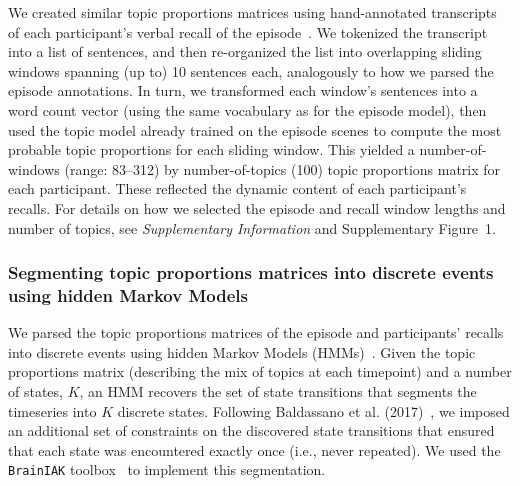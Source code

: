 \documentclass[10pt]{article}
\newcommand{\topicopt}{1}
\begin{document}
We created similar topic proportions matrices using hand-annotated transcripts of each participant's verbal recall of the episode~\citep{ChenEtal17}.  We tokenized the transcript into a list of sentences, and then re-organized the list into overlapping sliding windows spanning (up to) 10 sentences each, analogously to how we parsed the episode annotations.  In turn, we transformed each window's sentences into a word count vector (using the same vocabulary as for the episode model), then used the topic model already trained on the episode scenes to compute the most probable topic proportions for each sliding window.  This yielded a number-of-windows (range: 83--312) by number-of-topics (100) topic proportions matrix for each participant.  These reflected the dynamic content of each participant's recalls.  For details on how we selected the episode and recall window lengths and number of topics, see \textit{Supplementary Information} and Supplementary Figure~\topicopt.


\subsubsection*{Segmenting topic proportions matrices into discrete events using hidden Markov Models}
We parsed the topic proportions matrices of the episode and participants' recalls into discrete events using hidden Markov Models (HMMs)~\citep{Rabi89}.  Given the topic proportions matrix (describing the mix of topics at each timepoint) and a number of states, $K$, an HMM recovers the set of state transitions that segments the timeseries into $K$ discrete states.  Following Baldassano et al. (2017)~\cite{BaldEtal17}, we imposed an additional set of constraints on the discovered state transitions that ensured that each state was encountered exactly once (i.e., never repeated).  We used the \texttt{BrainIAK} toolbox~\citep{Brainiak} to implement this segmentation.
\end{document}
